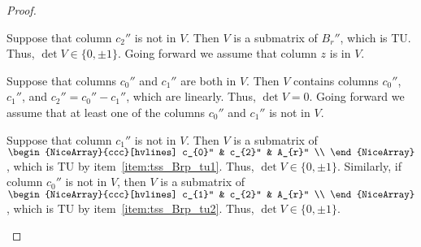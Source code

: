\begin{proof}
\begin{enumerate}
        Suppose that column $c_{2}''$ is not in $V$. Then $V$ is a submatrix of $B_{r}''$, which is TU. Thus, $\det V \in \{0, \pm 1\}$. Going forward we assume that column $z$ is in $V$.

        Suppose that columns $c_{0}''$ and $c_{1}''$ are both in $V$. Then $V$ contains columns $c_{0}''$, $c_{1}''$, and $c_{2}'' = c_{0}'' - c_{1}''$, which are linearly. Thus, $\det V = 0$. Going forward we assume that at least one of the columns $c_{0}''$ and $c_{1}''$ is not in $V$.

        Suppose that column $c_{1}''$ is not in $V$. Then $V$ is a submatrix of $\begin{NiceArray}{ccc}[hvlines] c_{0}'' & c_{2}'' & A_{r}'' \\ \end{NiceArray}$, which is TU by item~\ref{item:tss_Brp_tu1}. Thus, $\det V \in \{0, \pm 1\}$. Similarly, if column $c_{0}''$ is not in $V$, then $V$ is a submatrix of $\begin{NiceArray}{ccc}[hvlines] c_{1}'' & c_{2}'' & A_{r}'' \\ \end{NiceArray}$, which is TU by item~\ref{item:tss_Brp_tu2}. Thus, $\det V \in \{0, \pm 1\}$.

    \end{enumerate}
\end{proof}

